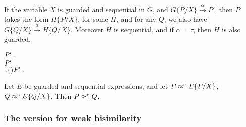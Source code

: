 \begin{lemma}
If the variable $X$ is guarded and sequential in $G$, and
$G\{P/X\}\overset{\alpha}{\rightarrow} P'$, then $P'$ takes the form
$H\{P/X\}$, for some  $H$, and for any $Q$, we also have 
$G\{Q/X\}\overset{\alpha}{\rightarrow} H\{Q/X\}$. Moreover $H$ is
sequential, and if $\alpha = \tau$, then $H$ is also guarded.
\begin{alltt}
\HOLTokenTurnstile{}   \HOLSymConst{\HOLTokenConj{}}   \HOLSymConst{\HOLTokenImp{}}
   \HOLSymConst{\HOLTokenForall{}}  \ensuremath{\HOLBoundVar{P}\sp{\prime}}.
         \HOLTokenTransBegin{}\HOLTokenTransEnd \ensuremath{\HOLBoundVar{P}\sp{\prime}} \HOLSymConst{\HOLTokenImp{}}
       \HOLSymConst{\HOLTokenExists{}}.   \HOLSymConst{\HOLTokenConj{}} \ensuremath{(} \HOLSymConst{\ensuremath{=}} \HOLSymConst{\ensuremath{\tau}} \HOLSymConst{\HOLTokenImp{}}  \ensuremath{)} \HOLSymConst{\HOLTokenConj{}} \ensuremath{\HOLBoundVar{P}\sp{\prime}} \HOLSymConst{\ensuremath{=}}   \HOLSymConst{\HOLTokenConj{}} \HOLSymConst{\HOLTokenForall{}}.   \HOLTokenTransBegin{}\HOLTokenTransEnd {} 
\end{alltt}
\end{lemma}

\begin{theorem}
  \label{thm:Mil89s3f}
Let $E$ be guarded and sequential expressions, and let $P \mathrel{\approx^{\rm{c}}}
E\{P/X\}$,
$Q \mathrel{\approx^{\rm{c}}} E\{Q/X\}$. Then $P \mathrel{\approx^{\rm{c}}} Q$.
\begin{alltt}
\HOLTokenTurnstile{}   \HOLSymConst{\HOLTokenConj{}}   \HOLSymConst{\HOLTokenConj{}}  \HOLSymConst{\HOLTokenObsCongr}   \HOLSymConst{\HOLTokenConj{}}  \HOLSymConst{\HOLTokenObsCongr}   \HOLSymConst{\HOLTokenImp{}}  \HOLSymConst{\HOLTokenObsCongr} 
\end{alltt}
\end{theorem}

\subsubsection{The version for weak bisimilarity}

